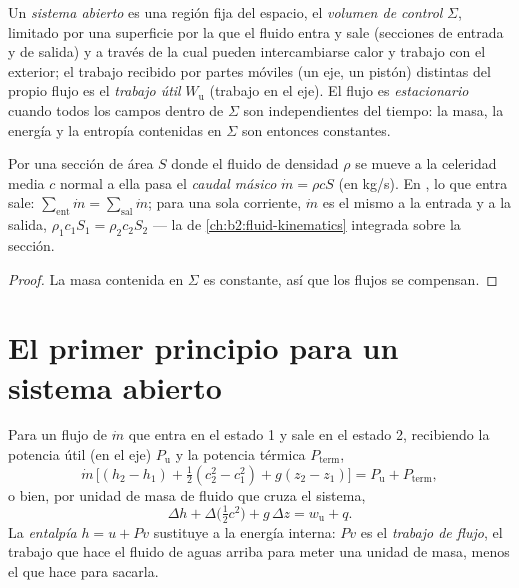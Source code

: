 \begin{definition}\label{def:b2:open-systems:cv}
Un \emph{sistema abierto} es una región fija del espacio,
el \emph{volumen de control} $\Sigma$, limitado por una
superficie por la que el fluido entra y sale (secciones de entrada y de salida)
y a través de la cual pueden intercambiarse calor y trabajo con el
exterior; el trabajo recibido por partes móviles (un eje, un pistón)
distintas del propio flujo es el \emph{trabajo útil}
$W_{\text{u}}$ (trabajo en el eje). El flujo es \emph{estacionario} cuando todos los campos dentro de $\Sigma$ son independientes del tiempo: la masa,
la energía y la entropía contenidas en $\Sigma$ son entonces constantes.
\end{definition}

\begin{proposition}\label{prop:b2:open-systems:mass}
Por una sección de área $S$ donde el fluido de densidad $\rho$ se mueve
a la celeridad media $c$ normal a ella pasa el \emph{caudal
másico} $\dot m = \rho c S$ (en \unit{kg/s}). En
, lo que entra sale: $\sum_{\text{ent}}\dot m = \sum_{\text{sal}}
\dot m$; para una sola corriente, $\dot m$ es el mismo a la entrada y a la salida,
$\rho_1c_1S_1 = \rho_2c_2S_2$ --- la  de
\cref{ch:b2:fluid-kinematics} integrada sobre la sección.
\end{proposition}

\begin{proof}
La masa contenida en $\Sigma$ es constante, así que los flujos se compensan.
\end{proof}

\section{El primer principio para un sistema abierto}

\begin{theorem}\label{thm:b2:open-systems:firstlaw}
Para un flujo  de  $\dot m$ que entra en el estado 1
y sale en el estado 2, recibiendo la potencia útil (en el eje)
$P_{\text{u}}$ y la potencia térmica $P_{\text{term}}$,
\[
\dot m\,\Big[(h_2 - h_1) + \tfrac12(c_2^2 - c_1^2) + g(z_2 - z_1)\Big]
= P_{\text{u}} + P_{\text{term}} ,
\]
o bien, por unidad de masa de fluido que cruza el sistema,
\[
\Delta h + \Delta\big(\tfrac12c^2\big) + g\,\Delta z = w_{\text{u}} + q .
\]
La \emph{entalpía} $h = u + Pv$ sustituye a
la energía interna: $Pv$ es el \emph{trabajo de flujo}, el trabajo que hace el
fluido de aguas arriba para meter una unidad de masa, menos el que hace para
sacarla.
\end{theorem}

